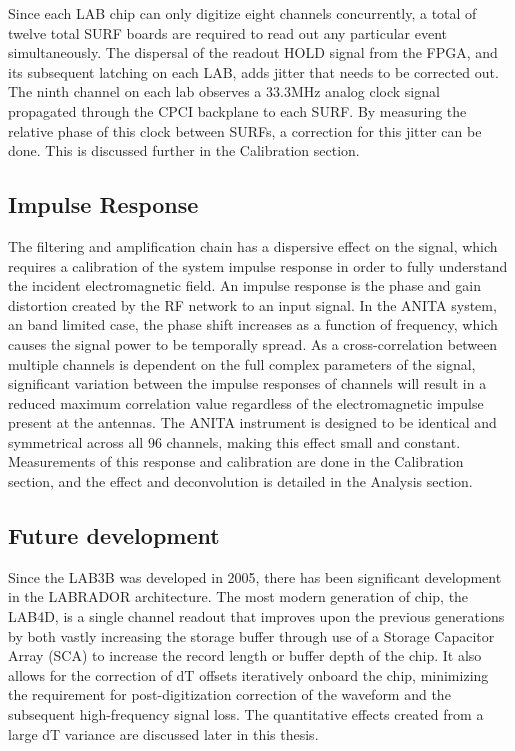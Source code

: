  	Since each LAB chip can only digitize eight channels concurrently, a total of twelve total SURF boards are required to read out any particular event simultaneously.  The dispersal of the readout HOLD signal from the FPGA, and its subsequent latching on each LAB, adds jitter that needs to be corrected out.  The ninth channel on each lab observes a 33.3MHz analog clock signal propagated through the CPCI backplane to each SURF.  By measuring the relative phase of this clock between SURFs, a correction for this jitter can be done.  This is discussed further in the Calibration section.
	
	\subsection{Impulse Response}
	The filtering and amplification chain has a dispersive effect on the signal, which requires a calibration of the system impulse response in order to fully understand the incident electromagnetic field.  An impulse response is the phase and gain distortion created by the RF network to an input signal.  In the ANITA system, an band limited case, the phase shift increases as a function of frequency, which causes the signal power to be temporally spread.  As a cross-correlation between multiple channels is dependent on the full complex parameters of the signal, significant variation between the impulse responses of channels will result in a reduced maximum correlation value regardless of the electromagnetic impulse present at the antennas.  The ANITA instrument is designed to be identical and symmetrical across all 96 channels, making this effect small and constant.  Measurements of this response and calibration are done in the Calibration section, and the effect and deconvolution is detailed in the Analysis section.

	
	\subsection{Future development}
	Since the LAB3B was developed in 2005, there has been significant development in the LABRADOR architecture.  The most modern generation of chip, the LAB4D, is a single channel readout that improves upon the previous generations by both vastly increasing the storage buffer through use of a Storage Capacitor Array (SCA) to increase the record length or buffer depth of the chip.  It also allows for the correction of dT offsets iteratively onboard the chip, minimizing the requirement for post-digitization correction of the waveform and the subsequent high-frequency signal loss.  The quantitative effects created from a large dT variance are discussed later in this thesis.
	
